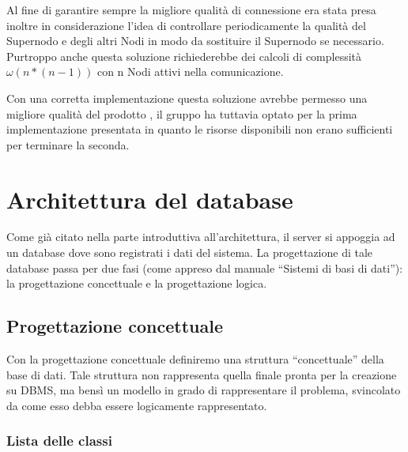 Al fine di garantire sempre la migliore qualità di connessione era stata presa inoltre in considerazione l'idea di controllare periodicamente la qualità del Supernodo e degli altri Nodi in modo da sostituire il Supernodo se necessario. Purtroppo anche questa soluzione richiederebbe dei calcoli di complessità $\omega(n*(n-1))$ con n Nodi attivi nella comunicazione.

Con una corretta implementazione questa soluzione avrebbe permesso una migliore qualità del prodotto \caName, il gruppo ha tuttavia optato per la prima implementazione presentata in quanto le risorse disponibili non erano sufficienti per terminare la seconda.


\clearpage

\section{Architettura del database}\label{sec:database}

Come già citato nella parte introduttiva all'architettura, il server si appoggia ad un database dove sono registrati i dati del sistema. La progettazione di tale database passa per due fasi (come appreso dal manuale ``Sistemi di basi di dati''): la progettazione concettuale e la progettazione logica.

\subsection{Progettazione concettuale}
Con la progettazione concettuale definiremo una struttura ``concettuale'' della base di dati. Tale struttura non rappresenta quella finale pronta per la creazione su DBMS, ma bensì un modello in grado di rappresentare il problema, svincolato da come esso debba essere logicamente rappresentato.

\subsubsection{Lista delle classi}

